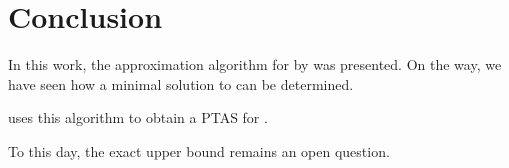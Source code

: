 \section{Conclusion}

In this work, the approximation algorithm for \RL by \citet{schrijver99} was presented.
On the way, we have seen how a minimal solution to \RRL can be determined.


\citet{khanna97} uses this algorithm to obtain a PTAS for \RL.

To this day, the exact upper bound remains an open question.